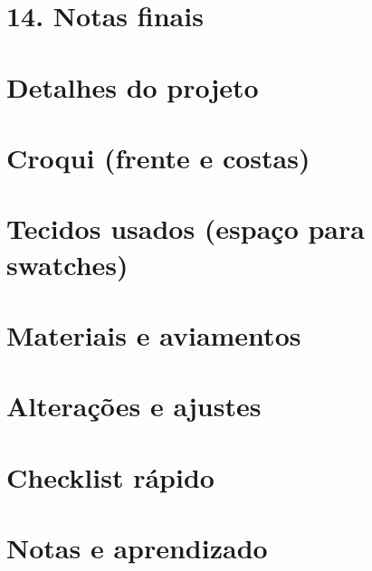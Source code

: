 \documentclass[
  brazilian,
  8pt,
  oneside]{book}
\begin{document}
\section{14. Notas finais}\label{notas-finais}

\section{Detalhes do projeto}\label{detalhes-do-projeto-1}

\section{Croqui (frente e costas)}\label{croqui-frente-e-costas-1}

\section{Tecidos usados (espaço para swatches)}\label{tecidos-usados-espauxe7o-para-swatches}

\section{Materiais e aviamentos}\label{materiais-e-aviamentos-1}

\section{Alterações e ajustes}\label{alterauxe7uxf5es-e-ajustes}

\section{Checklist rápido}\label{checklist-ruxe1pido}

\section{Notas e aprendizado}\label{notas-e-aprendizado-1}
\end{document}
